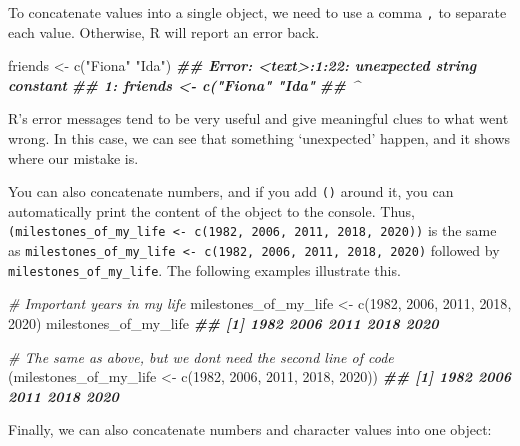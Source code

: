 \documentclass[
]{book}
\newenvironment{Shaded}{\begin{snugshade}}{\end{snugshade}}
\newcommand{\CommentTok}[1]{\textcolor[rgb]{0.56,0.35,0.01}{\textit{#1}}}
\newcommand{\DecValTok}[1]{\textcolor[rgb]{0.00,0.00,0.81}{#1}}
\newcommand{\DocumentationTok}[1]{\textcolor[rgb]{0.56,0.35,0.01}{\textbf{\textit{#1}}}}
\newcommand{\FunctionTok}[1]{\textcolor[rgb]{0.00,0.00,0.00}{#1}}
\newcommand{\NormalTok}[1]{#1}
\newcommand{\OtherTok}[1]{\textcolor[rgb]{0.56,0.35,0.01}{#1}}
\newcommand{\StringTok}[1]{\textcolor[rgb]{0.31,0.60,0.02}{#1}}
\begin{document}
To concatenate values into a single object, we need to use a comma \texttt{,} to separate each value. Otherwise, R will report an error back.

\begin{Shaded}
\begin{Highlighting}[]
\NormalTok{friends }\OtherTok{\textless{}{-}} \FunctionTok{c}\NormalTok{(}\StringTok{"Fiona"} \StringTok{"Ida"}\NormalTok{)}
\DocumentationTok{\#\# Error: \textless{}text\textgreater{}:1:22: unexpected string constant}
\DocumentationTok{\#\# 1: friends \textless{}{-} c("Fiona" "Ida"}
\DocumentationTok{\#\#                          \^{}}
\end{Highlighting}
\end{Shaded}

R's error messages tend to be very useful and give meaningful clues to what went wrong. In this case, we can see that something `unexpected' happen, and it shows where our mistake is.

You can also concatenate numbers, and if you add \texttt{()} around it, you can automatically print the content of the object to the console. Thus, \texttt{(milestones\_of\_my\_life\ \textless{}-\ c(1982,\ 2006,\ 2011,\ 2018,\ 2020))} is the same as \texttt{milestones\_of\_my\_life\ \textless{}-\ c(1982,\ 2006,\ 2011,\ 2018,\ 2020)} followed by \texttt{milestones\_of\_my\_life}. The following examples illustrate this.

\begin{Shaded}
\begin{Highlighting}[]
\CommentTok{\# Important years in my life}
\NormalTok{milestones\_of\_my\_life }\OtherTok{\textless{}{-}} \FunctionTok{c}\NormalTok{(}\DecValTok{1982}\NormalTok{, }\DecValTok{2006}\NormalTok{, }\DecValTok{2011}\NormalTok{, }\DecValTok{2018}\NormalTok{, }\DecValTok{2020}\NormalTok{)}
\NormalTok{milestones\_of\_my\_life}
\DocumentationTok{\#\# [1] 1982 2006 2011 2018 2020}

\CommentTok{\# The same as above, but we don\textquotesingle{}t need the second line of code}
\NormalTok{(milestones\_of\_my\_life }\OtherTok{\textless{}{-}} \FunctionTok{c}\NormalTok{(}\DecValTok{1982}\NormalTok{, }\DecValTok{2006}\NormalTok{, }\DecValTok{2011}\NormalTok{, }\DecValTok{2018}\NormalTok{, }\DecValTok{2020}\NormalTok{))}
\DocumentationTok{\#\# [1] 1982 2006 2011 2018 2020}
\end{Highlighting}
\end{Shaded}

Finally, we can also concatenate numbers and character values into one object:
\end{document}
